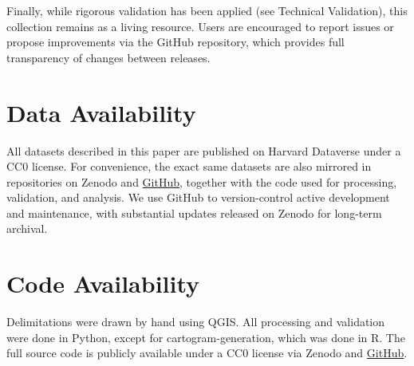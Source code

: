 \documentclass[11pt]{article}
\begin{document}
Finally, while rigorous validation has been applied (see Technical Validation), this collection remains as a living resource. Users are encouraged to report issues or propose improvements via the GitHub repository, which provides full transparency of changes between releases.


\section*{Data Availability}

All datasets described in this paper are published on Harvard Dataverse\cite{meco2_dataset} under a CC0 license. For convenience, the exact same datasets are also mirrored in repositories on Zenodo\cite{meco2_codebase} and \href{https://github.com/Thevesh/paper-meco-maps}{GitHub}, together with the code used for processing, validation, and analysis. We use GitHub to version-control active development and maintenance, with substantial updates released on Zenodo for long-term archival.

\section*{Code Availability}

Delimitations were drawn by hand using QGIS. All processing and validation were done in Python, except for cartogram-generation, which was done in R. The full source code is publicly available under a CC0 license via Zenodo\cite{meco2_codebase} and \href{https://github.com/Thevesh/paper-meco-maps}{GitHub}.
\end{document}
